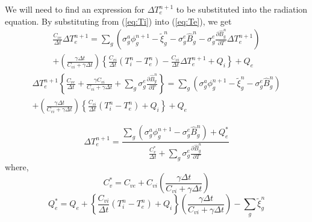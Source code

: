 \documentclass{article}
\newcommand{\dt}{\ensuremath{\Delta t}}
\newcommand{\cviOdt}{\ensuremath{\frac{C_{vi}}{\dt}}}
\newcommand{\cveOdt}{\ensuremath{\frac{C_{ve}}{\dt}}}
\newcommand{\Cvs}{\ensuremath{C_{v}^{*}}}
\newcommand{\cvsOdt}{\ensuremath{\frac{\Cvs}{\dt}}}
\newcommand{\Bgn}{\ensuremath{\hat{B}_{g}^{n}}}
\newcommand{\pBgndT}{\ensuremath{\frac{\partial\Bgn}{\partial T}}}
\begin{document}
We will need to find an expression for $\Delta T_{e}^{n+1}$ to be
substituted into the radiation equation.
By substituting from (\ref{eq:Ti}) into (\ref{eq:Te}), we get
\begin{multline}
        \cveOdt \Delta T_{e}^{n+1} =
                \sum_{g} \left(
                        \sigma_{g}^{a} \phi_{g}^{n+1} - \tilde{\xi}_{g}^{n}
                        - \sigma_{g}^{e} \Bgn
                        - \sigma_{g}^{e} \pBgndT \Delta T_{e}^{n+1} 
                        \right)
        \\
                         + \left(\frac{\gamma\dt}{C_{vi} + 
                                        \gamma \dt} \right)
                        \left\{\cviOdt(T_{i}^{n}-T_{e}^{n})
                                 - \cviOdt \Delta T_{e}^{n+1}
                        + Q_{i} \right\}
                        + Q_{e}
\end{multline}
\begin{multline}
        \Delta T_{e}^{n+1} \left\{ \cveOdt +
                \frac{\gamma C_{vi}}{C_{vi} + \gamma \dt } +
                \sum_{g} \sigma_{g}^{e} \pBgndT \right\} =
                   \sum_{g} \left( \sigma_{g}^{a} \phi_{g}^{n+1} - 
                        \tilde{\xi}_{g}^{n} - \sigma_{g}^{e} \Bgn \right)
        \\
                  +  \left(\frac{\gamma\dt}{C_{vi} + 
                                        \gamma \dt} \right)
                        \left\{\cviOdt(T_{i}^{n}-T_{e}^{n}) + Q_{i} \right\}
                         + Q_{e}
\end{multline}

\begin{equation}
   \boxed{
        \Delta T_{e}^{n+1} =
                \frac{\sum_{g} \left( \sigma_{g}^{a} \phi_{g}^{n+1} 
                         - \sigma_{g}^{e} \Bgn \right)
                         + Q_{e}^{*}}
                {\cvsOdt + \sum_{g} \sigma_{g}^{e} \pBgndT}
         }
\label{eq:Tenp1}
\end{equation}
where,
\begin{equation}
        \Cvs = C_{ve} + C_{vi} \left(\frac{\gamma\dt}{C_{vi}+\gamma\dt}\right)
\end{equation}
\begin{equation}
        Q_{e}^{*} = Q_{e} + \left\{ \cviOdt (T_{i}^{n} - T_{e}^{n}) +
                                Q_{i} \right\}
                \left(\frac{\gamma\dt}{C_{vi}+\gamma\dt}\right) -
                \sum_{g} \tilde{\xi}_{g}^{n}
\end{equation}
\end{document}
